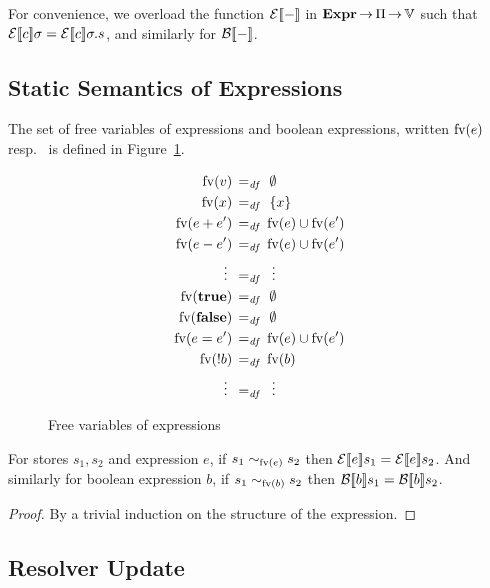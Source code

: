 \documentclass[11pt]{report}
\begin{document}
For convenience, we overload the function $\mathcal{E}[\![-]\!]$ in $\mathbf{Expr} \operatorname{\rightarrow} \Pi \operatorname{\rightarrow} \mathbb{V}$ such that $\mathcal{E}[\![c]\!]\sigma = \mathcal{E}[\![c]\!]\sigma.s$, and similarly for $\mathcal{B}[\![-]\!]$. 


\subsection{Static Semantics of Expressions} %
\label{sub:static_semantics_of_expressions}

The set of free variables of expressions and boolean expressions, written $\mathrm{fv}(e)$ resp.~ is defined in Figure~\ref{fig:expfv}. 

\begin{figure}[h]
	\centering
	\begin{align*}
		\mathrm{fv}(v) \operatorname{\;=_{\mathit{df}}\;} {} & \operatorname{\emptyset} \\ 
		\mathrm{fv}(x) \operatorname{\;=_{\mathit{df}}\;} {} & \left\lbrace x \right\rbrace \\
		\mathrm{fv}(e + e') \operatorname{\;=_{\mathit{df}}\;} {} & \mathrm{fv}(e) \cup \mathrm{fv}(e') \\
		\mathrm{fv}(e - e') \operatorname{\;=_{\mathit{df}}\;} {} & \mathrm{fv}(e) \cup \mathrm{fv}(e') \\
		\vdots~ \operatorname{\;=_{\mathit{df}}\;} {} & ~\vdots \\
		\mathrm{fv}(\mathbf{true}) \operatorname{\;=_{\mathit{df}}\;} {} & \operatorname{\emptyset} \\
		\mathrm{fv}(\mathbf{false}) \operatorname{\;=_{\mathit{df}}\;} {} & \operatorname{\emptyset} \\
		\mathrm{fv}(e = e') \operatorname{\;=_{\mathit{df}}\;} {} & \mathrm{fv}(e) \cup \mathrm{fv}(e') \\
		\mathrm{fv}(!b) \operatorname{\;=_{\mathit{df}}\;} {} & \mathrm{fv}(b) \\
		\vdots~ \operatorname{\;=_{\mathit{df}}\;} {} & ~\vdots
	\end{align*}
	\caption{Free variables of expressions}
	\label{fig:expfv}
\end{figure}

\begin{lemma}
	\label{lem:expr-fv}
	For stores $s_1,s_2$ and expression $e$, if $s_1 \sim_{\mathrm{fv}(e)} s_2$ then $\mathcal{E}[\![e]\!]s_1 = \mathcal{E}[\![e]\!]s_2$. And similarly for boolean expression $b$, if $s_1 \sim_{\mathrm{fv}(b)} s_2$ then $\mathcal{B}[\![b]\!]s_1 = \mathcal{B}[\![b]\!]s_2$. 
\end{lemma}

\begin{proof}
	By a trivial induction on the structure of the expression.
\end{proof}


\subsection{Resolver Update} %
\label{sub:resolver_update}
\end{document}
